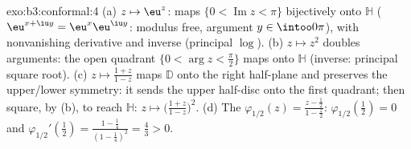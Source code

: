 \begin{solution}{exo:b3:conformal:4}
(a) $z \mapsto \eu^z$: maps $\{0 < \operatorname{Im}z <
\pi\}$ bijectively onto $\mathbb H$ ($\eu^{x+\iu y} =
\eu^x\eu^{\iu y}$: modulus free, argument $y \in
\intoo0\pi$),  with nonvanishing derivative and
 inverse (principal $\log$).
(b) $z \mapsto z^2$ doubles arguments: the open quadrant
$\{0 < \arg z < \frac\pi2\}$ maps  onto $\mathbb
H$ (inverse: principal square root).
(c) $z \mapsto \frac{1 + z}{1 - z}$ maps $\mathbb D$ onto the
right half-plane and preserves the upper/lower symmetry: it
sends the upper half-disc onto the first quadrant; then
square, by (b), to reach $\mathbb H$: $z \mapsto \bigl(\frac{1
+ z}{1 - z}\bigr)^2$.
(d) The  $\varphi_{1/2}(z) = \frac{z -
\frac12}{1 - \frac z2}$: $\varphi_{1/2}(\tfrac12) = 0$ and
$\varphi_{1/2}'(\tfrac12) = \frac{1 - \frac14}{(1 -
\frac14)^2} = \frac43 > 0$.
\end{solution}

